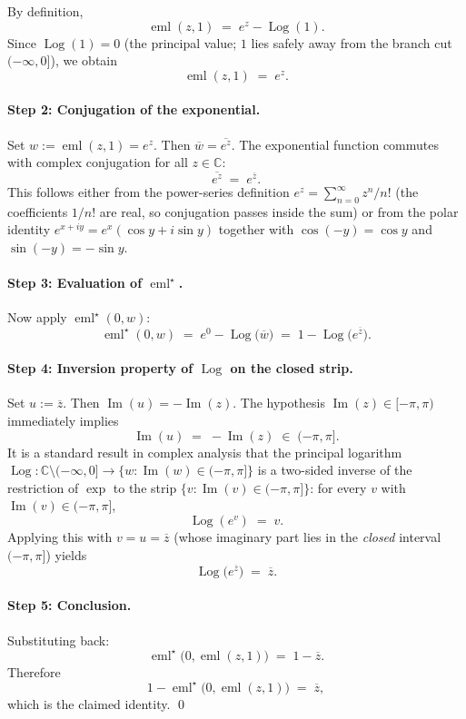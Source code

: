 \documentclass[11pt,a4paper]{article}
\theoremstyle{definition}
\newcommand{\eml}{\operatorname{eml}}
\newcommand{\emlstar}{\operatorname{eml}^\star}
\newcommand{\Log}{\operatorname{Log}}   %
\newcommand{\conj}[1]{\overline{#1}}
\newcommand{\C}{\mathbb{C}}
\newcommand{\im}{\operatorname{Im}}
\begin{document}
By definition,
\[
  \eml(z,1) \;=\; e^z - \Log(1).
\]
Since $\Log(1)=0$ (the principal value; $1$ lies safely away from the branch
cut $(-\infty,0]$), we obtain
\[
  \eml(z,1) \;=\; e^z.
\]

\paragraph{Step 2: Conjugation of the exponential.}

Set $w:=\eml(z,1)=e^z$.  Then $\conj{w}=\conj{e^z}$.  The exponential
function commutes with complex conjugation for all $z\in\C$:
\[
  \conj{e^z} \;=\; e^{\conj{z}}.
\]
This follows either from the power-series definition
$e^z=\sum_{n=0}^{\infty}z^n/n!$ (the coefficients $1/n!$ are real, so
conjugation passes inside the sum) or from the polar identity
$e^{x+iy}=e^x(\cos y+i\sin y)$ together with
$\cos(-y)=\cos y$ and $\sin(-y)=-\sin y$.

\paragraph{Step 3: Evaluation of \texorpdfstring{$\emlstar$}{eml*}.}

Now apply $\emlstar(0,w)$:
\[
  \emlstar(0,w)
  \;=\; e^0 - \Log\!\bigl(\conj{w}\bigr)
  \;=\; 1 - \Log\!\bigl(e^{\conj{z}}\bigr).
\]

\paragraph{Step 4: Inversion property of $\Log$ on the closed strip.}

Set $u:=\conj{z}$.  Then $\im(u)=-\im(z)$.  The hypothesis
$\im(z)\in[-\pi,\pi)$ immediately implies
\[
  \im(u) \;=\; -\im(z) \;\in\; (-\pi,\pi].
\]
It is a standard result in complex analysis that the principal logarithm
$\Log:\C\setminus(-\infty,0]\to\{w:\im(w)\in(-\pi,\pi]\}$ is a two-sided
inverse of the restriction of $\exp$ to the strip
$\{v:\im(v)\in(-\pi,\pi]\}$: for every $v$ with $\im(v)\in(-\pi,\pi]$,
\[
  \Log(e^v) \;=\; v.
\]
Applying this with $v=u=\conj{z}$ (whose imaginary part lies in the
\emph{closed} interval $(-\pi,\pi]$) yields
\[
  \Log\!\bigl(e^{\conj{z}}\bigr) \;=\; \conj{z}.
\]

\paragraph{Step 5: Conclusion.}

Substituting back:
\[
  \emlstar\!\bigl(0,\eml(z,1)\bigr)
  \;=\; 1 - \conj{z}.
\]
Therefore
\[
  1 - \emlstar\!\bigl(0,\eml(z,1)\bigr)
  \;=\; \conj{z},
\]
which is the claimed identity. \qed
\end{document}
